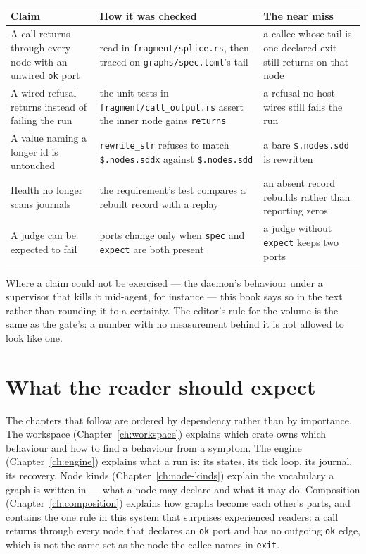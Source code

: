 \begin{center}
\footnotesize
\begin{tabular}{@{}p{}p{}p{}@{}}
\toprule
	\textbf{Claim} & \textbf{How it was checked} & \textbf{The near miss} \\
	\midrule
	A call returns through every node with an unwired \texttt{ok} port & read in
	\texttt{fragment/splice.rs}, then traced on \texttt{graphs/spec.toml}'s tail & a callee whose
	tail is one declared exit still returns on that node \\
	A wired refusal returns instead of failing the run & the unit tests in
	\texttt{fragment/call\_output.rs} assert the inner node gains \texttt{returns} & a refusal no host
	wires still fails the run \\
	A value naming a longer id is untouched & \texttt{rewrite\_str} refuses to match
	\texttt{\$.nodes.sddx} against \texttt{\$.nodes.sdd} & a bare \texttt{\$.nodes.sdd} is rewritten \\
	Health no longer scans journals & the requirement's test compares a rebuilt record with a replay
	& an absent record rebuilds rather than reporting zeros \\
	A judge can be expected to fail & ports change only when \texttt{spec} and \texttt{expect} are
	both present & a judge without \texttt{expect} keeps two ports \\
	\bottomrule
\end{tabular}
\end{center}

Where a claim could not be exercised --- the daemon's behaviour under a supervisor that kills it
mid-agent, for instance --- this book says so in the text rather than rounding it to a certainty.
The editor's rule for the volume is the same as the gate's: a number with no measurement behind it
is not allowed to look like one.

\section{What the reader should expect}

The chapters that follow are ordered by dependency rather than by importance. The workspace
(Chapter~\ref{ch:workspace}) explains which crate owns which behaviour and how to find a behaviour
from a symptom. The engine (Chapter~\ref{ch:engine}) explains what a run is: its states, its tick
loop, its journal, its recovery. Node kinds (Chapter~\ref{ch:node-kinds}) explain the vocabulary a
graph is written in --- what a node may declare and what it may do. Composition
(Chapter~\ref{ch:composition}) explains how graphs become each other's parts, and contains the one
rule in this system that surprises experienced readers: a call returns through every node that
declares an \texttt{ok} port and has no outgoing \texttt{ok} edge, which is not the same set as the
node the callee names in \texttt{exit}.

